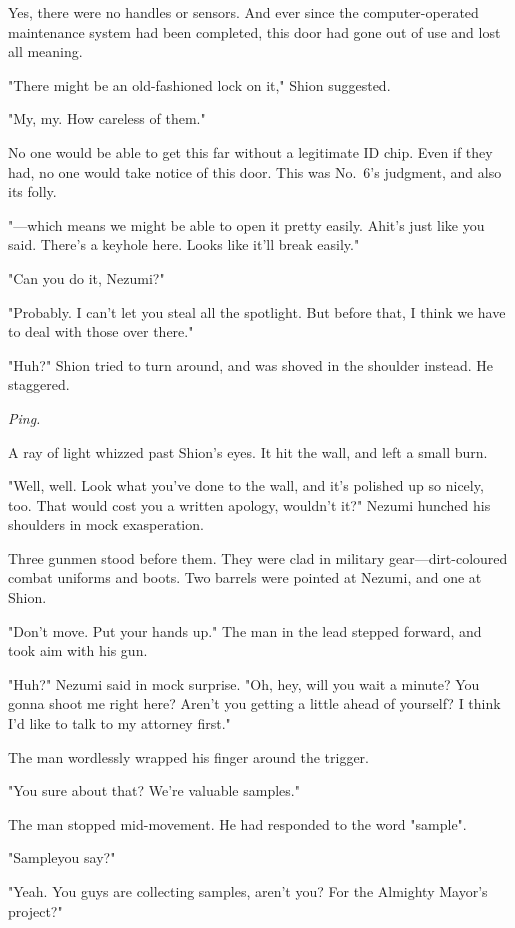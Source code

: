 Yes, there were no handles or sensors. And ever since the
computer-operated maintenance system had been completed, this door had
gone out of use and lost all meaning.

"There might be an old-fashioned lock on it," Shion suggested.

"My, my. How careless of them."

No one would be able to get this far without a legitimate ID chip. Even
if they had, no one would take notice of this door. This was No.~6's
judgment, and also its folly.

"---which means we might be able to open it pretty easily. Ah\el it's just
like you said. There's a keyhole here. Looks like it'll break easily."

"Can you do it, Nezumi?"

"Probably. I can't let you steal all the spotlight. But before that, I
think we have to deal with those over there."

"Huh?" Shion tried to turn around, and was shoved in the shoulder
instead. He staggered.

\emph{Ping.}

A ray of light whizzed past Shion's eyes. It hit the wall, and left a
small burn.

"Well, well. Look what you've done to the wall, and it's polished up so
nicely, too. That would cost you a written apology, wouldn't it?" Nezumi
hunched his shoulders in mock exasperation.

Three gunmen stood before them. They were clad in military
gear---dirt-coloured combat uniforms and boots. Two barrels were pointed
at Nezumi, and one at Shion.

"Don't move. Put your hands up." The man in the lead stepped forward,
and took aim with his gun.

"Huh?" Nezumi said in mock surprise. "Oh, hey, will you wait a minute?
You gonna shoot me right here? Aren't you getting a little ahead of
yourself? I think I'd like to talk to my attorney first."

The man wordlessly wrapped his finger around the trigger.

"You sure about that? We're valuable samples."

The man stopped mid-movement. He had responded to the word "sample".

"Sample\el you say?"

"Yeah. You guys are collecting samples, aren't you? For the Almighty
Mayor's project?"

